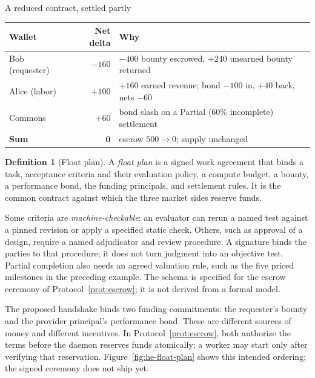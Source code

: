 \documentclass[11pt,a4paper]{article}
\theoremstyle{definition}
\newtheorem{definition}{Definition}[section]
\theoremstyle{definition}
\theoremstyle{remark}
\begin{document}
\begin{pdexample}{A reduced contract, settled partly}
\begin{center}\small
\begin{tabularx}{\textwidth}{@{}>{\raggedright\arraybackslash}p{4.0cm} r >{\raggedright\arraybackslash}X@{}}
\toprule
\textbf{Wallet} & \textbf{Net delta} & \textbf{Why} \\
\midrule
Bob (requester)   & $-160$ & $-400$ bounty escrowed, $+240$ unearned bounty returned \\
Alice (labor)     & $+100$ & $+160$ earned revenue; bond $-100$ in, $+40$ back, nets $-60$ \\
Commons           & $+60$  & bond slash on a Partial (60\% incomplete) settlement \\
\midrule
\textbf{Sum}      & $\mathbf{0}$ & escrow $500 \to 0$; supply unchanged \\
\bottomrule
\end{tabularx}
\end{center}
\end{pdexample}

\begin{definition}[Float plan]\label{def:float-plan}
\setlength{\parskip}{4pt plus 1pt}
A \emph{float plan} is a signed work agreement that binds a task, acceptance
criteria and their evaluation policy, a compute budget, a bounty, a performance
bond, the funding principals, and settlement rules. It is the common contract
against which the three market sides reserve funds.

Some criteria are \emph{machine-checkable}: an evaluator can rerun a named test
against a pinned revision or apply a specified static check. Others, such as
approval of a design, require a named adjudicator and review procedure. A
signature binds the parties to that procedure; it does not turn judgment into
an objective test. Partial completion also needs an agreed valuation rule,
such as the five priced milestones in the preceding example. The schema is
specified for the escrow ceremony of Protocol~\ref{prot:escrow}; it is not
derived from a formal model.
\end{definition}

The proposed handshake binds two funding commitments: the requester's bounty
and the provider principal's performance bond. These are different sources of
money and different incentives. In Protocol~\ref{prot:escrow}, both authorize
the terms before the daemon reserves funds atomically; a worker may start only
after verifying that reservation. Figure~\ref{fig:he-float-plan} shows this
intended ordering; the signed ceremony does not ship yet.
\end{document}
